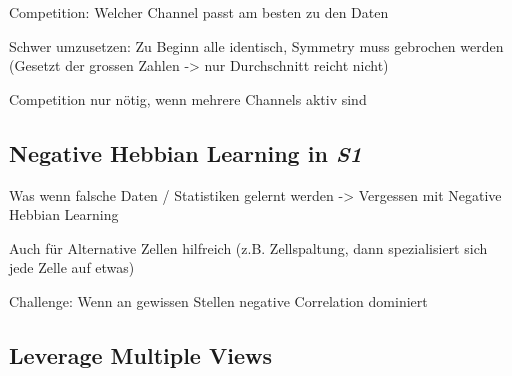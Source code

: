 Competition: Welcher Channel passt am besten zu den Daten


Schwer umzusetzen: Zu Beginn alle identisch, Symmetry muss gebrochen werden (Gesetzt der grossen Zahlen -> nur Durchschnitt reicht nicht)


Competition nur nötig, wenn mehrere Channels aktiv sind


\subsection{Negative Hebbian Learning in \emph{S1}}


Was wenn falsche Daten / Statistiken gelernt werden -> Vergessen mit Negative Hebbian Learning

Auch für Alternative Zellen hilfreich (z.B. Zellspaltung, dann spezialisiert sich jede Zelle auf etwas)

 Challenge: Wenn an gewissen Stellen negative Correlation dominiert


\subsection{Leverage Multiple Views}


